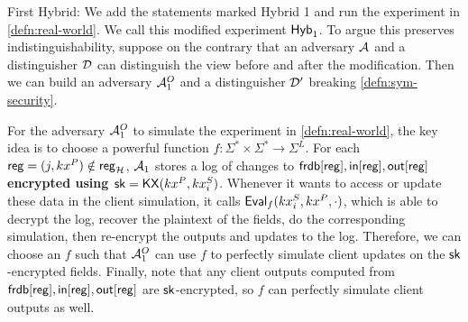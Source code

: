 

First Hybrid: We add the statements marked Hybrid 1 and run the experiment in \cref{defn:real-world}. We call this modified experiment $\mathsf{Hyb}_1$. To argue this preserves indistinguishability, suppose on the contrary that an adversary $\mathcal{A}$ and a distinguisher $\mathcal{D}$ can distinguish the view before and after the modification. Then we can build an adversary $\mathcal{A}_1^O$ and a distinguisher $\mathcal{D}'$ breaking \cref{defn:sym-security}. 

For the adversary $\mathcal{A}_1^O$ to simulate the experiment in \cref{defn:real-world}, the key idea is to choose a powerful function $f: \Sigma^* \times \Sigma^* \to \Sigma^L$. For each $\mathsf{reg} = (j, kx^P)\notin \mathsf{reg}_{\mathcal{H}}$, $\mathcal{A}_1$ stores a log of changes to $\mathsf{frdb}[\mathsf{reg}], \mathsf{in}[\mathsf{reg}], \mathsf{out}[\mathsf{reg}]$ \textbf{encrypted using ${\mathsf{sk}} = \mathsf{KX}(kx^P, kx_i^S)$}. Whenever it wants to access or update these data in the client simulation, it calls $\mathsf{Eval}_f(kx_i^S, kx^P, \cdot)$, which is able to decrypt the log, recover the plaintext of the fields, do the corresponding simulation, then re-encrypt the outputs and updates to the log. Therefore, we can choose an $f$ such that $\mathcal{A}_1^O$ can use $f$ to perfectly simulate client updates on the ${\mathsf{sk}}$-encrypted fields. Finally, note that any client outputs computed from $\mathsf{frdb}[\mathsf{reg}], \mathsf{in}[\mathsf{reg}], \mathsf{out}[\mathsf{reg}]$ are ${\mathsf{sk}}$-encrypted, so $f$ can perfectly simulate client outputs as well. 

